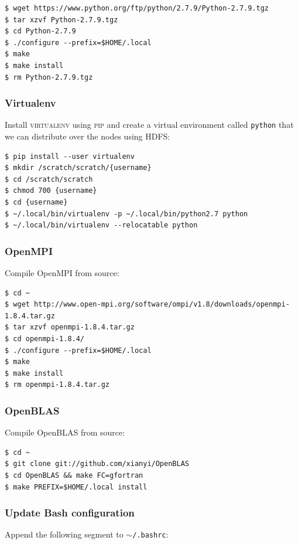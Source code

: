 \documentclass{article}
\begin{document}
\begin{verbatim}
$ wget https://www.python.org/ftp/python/2.7.9/Python-2.7.9.tgz
$ tar xzvf Python-2.7.9.tgz
$ cd Python-2.7.9
$ ./configure --prefix=$HOME/.local
$ make
$ make install
$ rm Python-2.7.9.tgz
\end{verbatim}

\subsubsection{Virtualenv}\label{app:virtualenv}

Install \textsc{virtualenv} using \textsc{pip} and create a virtual environment 
called \texttt{python} that we can distribute over the nodes using HDFS:

\begin{verbatim}
$ pip install --user virtualenv
$ mkdir /scratch/scratch/{username}
$ cd /scratch/scratch
$ chmod 700 {username}
$ cd {username}
$ ~/.local/bin/virtualenv -p ~/.local/bin/python2.7 python
$ ~/.local/bin/virtualenv --relocatable python
\end{verbatim}

\subsubsection{OpenMPI}\label{app:openmpi}
Compile OpenMPI from source:

\begin{verbatim}
$ cd ~
$ wget http://www.open-mpi.org/software/ompi/v1.8/downloads/openmpi-1.8.4.tar.gz
$ tar xzvf openmpi-1.8.4.tar.gz
$ cd openmpi-1.8.4/
$ ./configure --prefix=$HOME/.local
$ make
$ make install
$ rm openmpi-1.8.4.tar.gz
\end{verbatim}

\subsubsection{OpenBLAS}\label{app:openblas}
Compile OpenBLAS from source:

\begin{verbatim}
$ cd ~
$ git clone git://github.com/xianyi/OpenBLAS
$ cd OpenBLAS && make FC=gfortran
$ make PREFIX=$HOME/.local install
\end{verbatim}

\subsubsection{Update Bash configuration}\label{app:update-bashrc}
Append the following segment to \texttt{$\sim$/.bashrc}:
\end{document}
